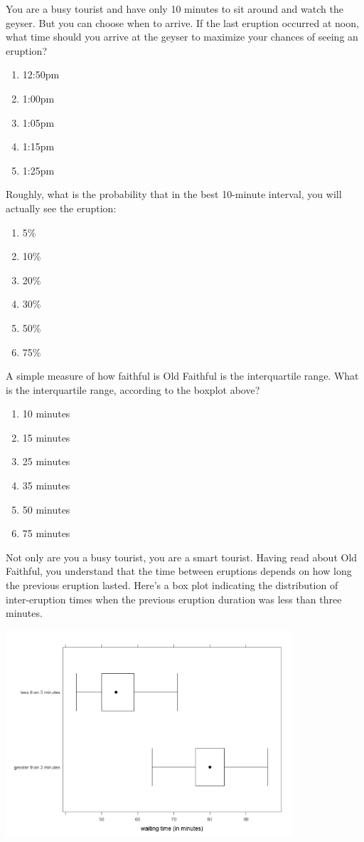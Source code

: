 \noindent
You are a busy tourist and have only 10 minutes to sit around and
watch the geyser.  But you can choose when to arrive.  If the last
eruption occurred at noon, what time should you arrive at the geyser
to maximize your chances of seeing an eruption?
\begin{enumerate}[leftmargin=1cm, itemsep=.1em]
\item 12:50pm
\item 1:00pm
\item 1:05pm
\item 1:15pm
\item 1:25pm
\end{enumerate}

\noindent
Roughly, what is the probability that in the best 10-minute interval,
you will actually see the eruption:
\begin{enumerate}[leftmargin=1cm, itemsep=0em]
\item 5\%
\item 10\%
\item 20\%
\item 30\%
\item 50\%
\item 75\%
\end{enumerate}

\noindent
A simple measure of how faithful is Old Faithful is the interquartile
range.  What is the interquartile range, according to the
boxplot above?
\begin{enumerate}[leftmargin=1cm, itemsep=0em]
\item 10 minutes
\item 15 minutes
\item 25 minutes
\item 35 minutes
\item 50 minutes
\item 75 minutes
\end{enumerate}

Not only are you a busy tourist, you are a smart tourist.  Having read
about Old Faithful, you understand that the time between eruptions
depends on how long the previous eruption lasted.   Here's a box
plot indicating the distribution of inter-eruption times when the
previous eruption duration was less than three minutes.  

\noindent
\includegraphics[width=4.2in]{includes/faithful2.png}

